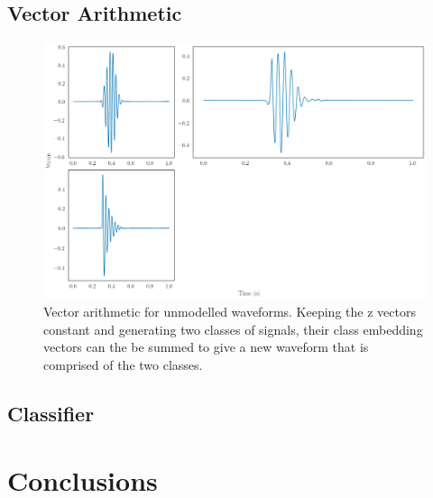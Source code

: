 \documentclass[12pt]{iopart}
\begin{document}
\subsection{Vector Arithmetic}
\begin{figure}
    \centering
    \includegraphics[width=\textwidth]{figures/adding.png}
    \caption{Vector arithmetic for unmodelled waveforms. Keeping the z vectors constant and generating two classes of signals, their class embedding vectors can the be summed to give a new waveform that is comprised of the two classes.}
    \label{fig:add}
\end{figure}
\subsection{Classifier}


\section{Conclusions}

\end{document}
